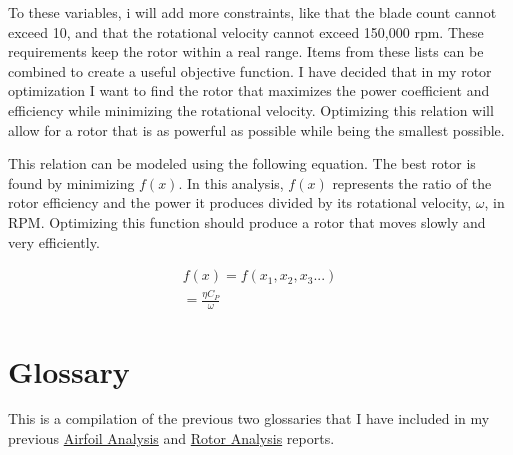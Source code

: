 \documentclass{article}
\begin{document}
To these variables, i will add more constraints, like that the blade count cannot exceed 10, and that the rotational velocity cannot exceed 150,000 rpm. These requirements keep the rotor within a real range. Items from these lists can be combined to create a useful objective function. I have decided that in my rotor optimization I want to find the rotor that maximizes the power coefficient and efficiency while minimizing the rotational velocity. Optimizing this relation will allow for a rotor that is as powerful as possible while being the smallest possible.

This relation can be modeled using the following equation. The best rotor is found by minimizing $f(x)$. In this analysis, $f(x)$ represents the ratio of the rotor efficiency and the power it produces divided by its rotational velocity, $\omega$, in RPM. Optimizing this function should produce a rotor that moves slowly and very efficiently.

\begin{equation}
\begin{aligned}
	f(x) = f(x_{1}, x_{2}, x_{3}...)\\
	      = \frac{\eta C_{P}}{\omega}
\end{aligned}
\end{equation}

\clearpage

\section{Glossary}

This is a compilation of the previous two glossaries that I have included in my previous \href{https://github.com/JoeSpencer1/497R-Projects/blob/Rotor-Analysis/Airfoil Analysis/Airfoil_Analysis.pdf}{Airfoil Analysis} and \href{https://github.com/JoeSpencer1/497R-Projects/blob/Rotor-Analysis/Rotor Analysis/Rotor_Analysis.pdf}{Rotor Analysis} reports.
\end{document}
